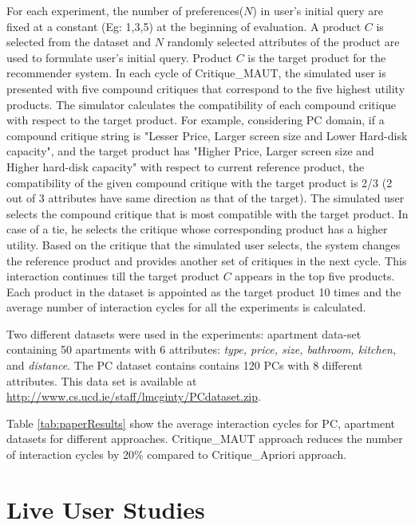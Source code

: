 For each experiment, the number of preferences($N$) in user's initial query are fixed at a constant (Eg: 1,3,5) at the beginning of evaluation.
A product $C$ is selected from the dataset and $N$ randomly selected attributes of the product are used to formulate user's initial query.
Product $C$ is the target product for the recommender system.
In each cycle of Critique\_MAUT, the simulated user is presented with five compound critiques that correspond to the five highest utility products.
The simulator calculates the compatibility of each compound critique with respect to the target product.
For example, considering PC domain, if a compound critique string is "Lesser Price, Larger screen size and Lower Hard-disk capacity", and the target product has "Higher Price, Larger screen size and Higher hard-disk capacity" with respect to current reference product, the compatibility of the given compound critique with the target product is 2/3 (2 out of 3 attributes have same direction as that of the target).
The simulated user selects the compound critique that is most compatible with the target product.
In case of a tie, he selects the critique whose corresponding product has a higher utility.
Based on the critique that the simulated user selects, the system changes the reference product and provides another set of critiques in the next cycle.
This interaction continues till the target product $C$ appears in the top five products.
Each product in the dataset is appointed as the target product 10 times and the average number of interaction cycles for all the experiments is calculated.

Two different datasets were used in the experiments: apartment data-set containing 50 apartments with 6 attributes: \textit{type, price, size, bathroom, kitchen,} and \textit{distance}.
The PC dataset contains contains 120 PCs with 8 different attributes. This data set is available at \url{http://www.cs.ucd.ie/staff/lmcginty/PCdataset.zip}.

Table \ref{tab:paperResults} show the average interaction cycles for PC, apartment datasets for different approaches.
Critique\_MAUT approach reduces the number of interaction cycles by 20\% compared to Critique\_Apriori approach.


\section{Live User Studies}
\label{sec:liveUser}

